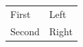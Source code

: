 \documentclass{article}
\begin{document}
\begin{tabular}{ll}
First & Left \\
Second & Right
\end{tabular}
\end{document}
